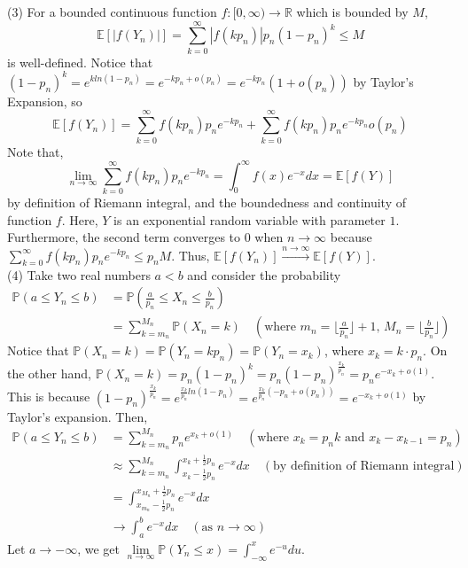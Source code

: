 \documentclass[12pt]{article}
\begin{document}
(3) For a bounded continuous function $f:[0,\infty)\rightarrow\mathbb{R}$ which is bounded by $M$, $$\mathbb{E}[|f(Y_{n})|]=\sum_{k=0}^{\infty}|f(kp_{n})|p_{n}(1-p_{n})^{k}\leqslant M$$ is well-defined.
Notice that $(1-p_{n})^{k}=e^{kln(1-p_{n})}=e^{-kp_{n}+o(p_{n})}=e^{-kp_{n}}(1+o(p_{n}))$ by Taylor's Expansion, so $$\mathbb{E}[f(Y_{n})]=\sum_{k=0}^{\infty}f(kp_{n})p_{n}e^{-kp_{n}}+\sum_{k=0}^{\infty}f(kp_{n})p_{n}e^{-kp_{n}}o(p_{n})$$
Note that, $$\lim_{n\rightarrow\infty}\sum_{k=0}^{\infty}f(kp_{n})p_{n}e^{-kp_{n}}=\int_{0}^{\infty}f(x)e^{-x}dx=\mathbb{E}[f(Y)]$$
by definition of Riemann integral, and the boundedness and continuity of function $f$. Here, $Y$ is an exponential random variable with parameter $1$. Furthermore, the second term converges to $0$ when $n\rightarrow\infty$ because $\sum_{k=0}^{\infty}f(kp_{n})p_{n}e^{-kp_{n}}\leqslant p_{n}M$. Thus, $\mathbb{E}[f(Y_{n})]\xrightarrow{n\rightarrow\infty}\mathbb{E}[f(Y)]$.\\
(4) Take two real numbers $a<b$ and consider the probability
\begin{align*}
	\mathbb{P}(a\leqslant Y_{n}\leqslant b) &= \mathbb{P}(\frac{a}{p_{n}}\leqslant X_{n}\leqslant \frac{b}{p_{n}})\\
	&=\sum_{k=m_{n}}^{M_{n}}\mathbb{P}(X_{n}=k)\quad(\text{where $m_n=\lfloor\frac{a}{p_{n}}\rfloor +1$, $M_{n}=\lfloor\frac{b}{p_{n}}\rfloor$})
	\end{align*}
Notice that $\mathbb{P}(X_{n}=k)=\mathbb{P}(Y_{n}=kp_{n})= \mathbb{P}(Y_{n}=x_{k})$, where $x_{k}=k\cdot p_{n}$. On the other hand, $\mathbb{P}(X_{n}=k)=p_{n}(1-p_{n})^{k} = p_{n}(1-p_{n})^{\frac{x_{k}}{p_{n}}} = p_{n} e^{-x_{k}+o(1)}$. This is because $(1-p_{n})^{\frac{x_{k}}{p_{n}}}=e^{\frac{x_{k}}{p_{n}}ln(1-p_{n})}=e^{\frac{x_{k}}{p_{n}}(-p_{n}+o(p_{n}))}=e^{-x_{k}+o(1)}$ by Taylor's expansion. Then,
\begin{align*}
	\mathbb{P}(a\leqslant Y_{n}\leqslant b) &= \sum_{k=m_{n}}^{M_{n}}p_{n}e^{x_{k}+o(1)}\quad(\text{where $x_{k}=p_{n}k$ and $x_{k}-x_{k-1}=p_{n}$})\\
	&\approx\sum_{k=m_{n}}^{M_{n}}\int_{x_{k}-\frac{1}{2}p_{n}}^{x_{k}+\frac{1}{2}p_{n}}e^{-x}dx\quad(\text{by definition of Riemann integral})\\
	&=\int_{x_{m_{n}}-\frac{1}{2}p_{n}}^{x_{M_{n}}+\frac{1}{2}p_{n}}e^{-x}dx\\
	& \rightarrow \int_{a}^{b}e^{-x}dx\quad(\text{as $n\rightarrow\infty$})
\end{align*}
Let $a\rightarrow -\infty$, we get $\lim\limits_{n\rightarrow\infty}\mathbb{P}(Y_{n}\leqslant x)=\int_{-\infty}^{x}e^{-u}du$.
\end{document}
